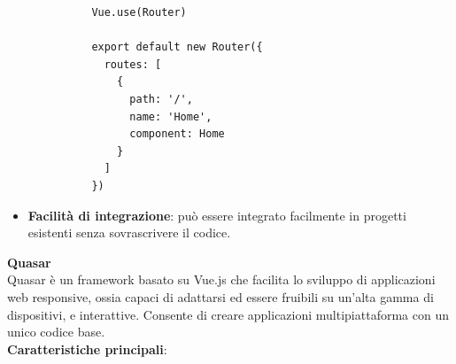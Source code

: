 \documentclass[a4paper, 12pt]{book}
\begin{document}
\begin{itemize}
\begin{lstlisting}
          Vue.use(Router)

          export default new Router({
            routes: [
              {
                path: '/',
                name: 'Home',
                component: Home
              }
            ]
          })
        \end{lstlisting}
  \item \textbf{Facilità di integrazione}: può essere integrato facilmente in progetti esistenti senza sovrascrivere il codice.\\
\end{itemize}

\newpage

{\Large\textbf{Quasar}}\\

Quasar \cite{Quasar} è un framework basato su Vue.js che facilita lo sviluppo di applicazioni web responsive, ossia capaci di adattarsi
ed essere fruibili su un'alta gamma di dispositivi, e interattive. Consente di creare applicazioni
multipiattaforma con un unico codice base.\\

\textbf{Caratteristiche principali}:
\end{document}
